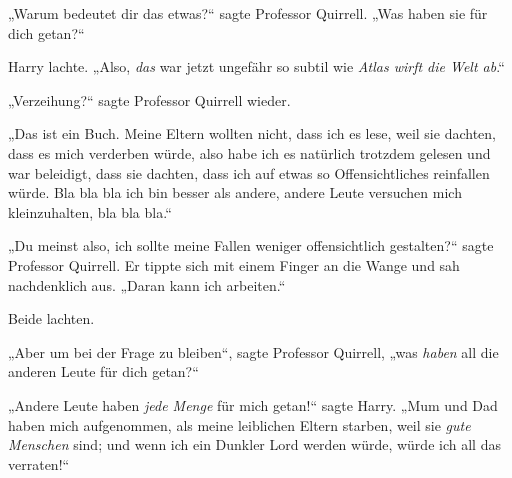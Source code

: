 „Warum bedeutet dir das etwas?“ sagte Professor Quirrell.
„Was haben sie für dich getan?“

Harry lachte.
„Also, \emph{das} war jetzt ungefähr so subtil wie \emph{Atlas wirft die Welt ab}.“%

„Verzeihung?“ sagte Professor Quirrell wieder.

„Das ist ein Buch. Meine Eltern wollten nicht, dass ich es lese, weil sie dachten, dass es mich verderben würde, also habe ich es natürlich trotzdem gelesen und war beleidigt, dass sie dachten, dass ich auf etwas so Offensichtliches reinfallen würde. Bla bla bla ich bin besser als andere, andere Leute versuchen mich kleinzuhalten, bla bla bla.“

„Du meinst also, ich sollte meine Fallen weniger offensichtlich gestalten?“ sagte Professor Quirrell. Er tippte sich mit einem Finger an die Wange und sah nachdenklich aus.
„Daran kann ich arbeiten.“

Beide lachten.

„Aber um bei der Frage zu bleiben“, sagte Professor Quirrell, „was \emph{haben} all die anderen Leute für dich getan?“

„Andere Leute haben \emph{jede Menge} für mich getan!“ sagte Harry.
„Mum und Dad haben mich aufgenommen, als meine leiblichen Eltern starben, weil sie \emph{gute Menschen} sind; und wenn ich ein Dunkler Lord werden würde, würde ich all das verraten!“

